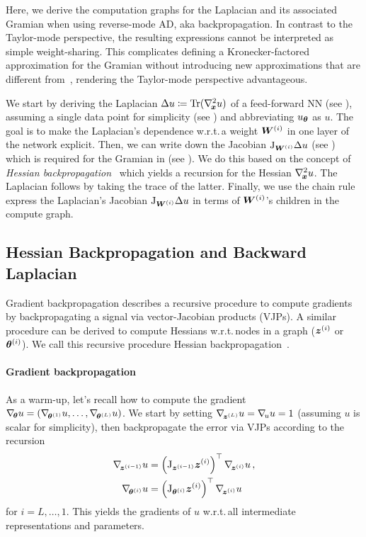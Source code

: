Here, we derive the computation graphs for the Laplacian and its associated Gramian when using reverse-mode AD, aka backpropagation.
In contrast to the Taylor-mode perspective, the resulting expressions cannot be interpreted as simple weight-sharing.
This complicates defining a Kronecker-factored approximation for the Gramian without introducing new approximations that are different from~\citet{eschenhagen2023kroneckerfactored}, rendering the Taylor-mode perspective advantageous.

We start by deriving the Laplacian $\Delta u \coloneqq \operatorname{Tr}(\nabla_{\!{{\bm{x}}}}^{2} u)$ of a feed-forward NN (see ), assuming a single data point for simplicity (see ) and abbreviating $u_{{\bm{\theta}}}$ as $u$.
The goal is to make the Laplacian's dependence w.r.t.\,a weight ${\bm{W}}^{(i)}$ in one layer of the network explicit.
Then, we can write down the Jacobian $\mathrm{J}_{{\bm{W}}^{(i)}}\Delta u$ (see ) which is required for the Gramian in  (see ).
We do this based on the concept of \emph{Hessian backpropagation}~\citep[HBP,]{dangel2020modular} which yields a recursion for the Hessian $\nabla_{\!{{\bm{x}}}}^{2}u$.
The Laplacian follows by taking the trace of the latter.
Finally, we use the chain rule express the Laplacian's Jacobian $\mathrm{J}_{{\bm{W}}^{(i)}} \Delta u$ in terms of ${\bm{W}}^{(i)}$'s children in the compute graph.

\subsection{Hessian Backpropagation and Backward Laplacian}\label{sec:laplacian-computation-graph}

Gradient backpropagation describes a recursive procedure to compute gradients by backpropagating a signal via vector-Jacobian products (VJPs).
A similar procedure can be derived to compute Hessians w.r.t.\,nodes in a graph (${\bm{z}}^{(i)}$ or ${\bm{\theta}}^{(i)}$).
We call this recursive procedure Hessian backpropagation~\citep{dangel2020modular}.

\paragraph{Gradient backpropagation} As a warm-up, let's recall how to compute the gradient $\nabla_{\!{{\bm{\theta}}}}u = (\nabla_{\!{{\bm{\theta}}^{(1)}}}u, \dots, \nabla_{\!{{\bm{\theta}}^{(L)}}}u)$.
We start by setting $\nabla_{\!{{\bm{z}}^{(L)}}}u = \nabla_{\!{u}}u = 1$ (assuming $u$ is scalar for simplicity), then backpropagate the error via VJPs according to the recursion
\begin{align}\label{eq:gradient-backpropagation}
  \begin{split}
    \nabla_{\!{{\bm{z}}^{(i-1)}}}u
    &=
      \left( \mathrm{J}_{{\bm{z}}^{(i-1)}} {\bm{z}}^{(i)} \right)^{\top} \nabla_{\!{{\bm{z}}^{(i)}}}u\,,
    \\
    \nabla_{\!{{\bm{\theta}}^{(i)}}}u
    &=
      \left( \mathrm{J}_{{\bm{\theta}}^{(i)}} {\bm{z}}^{(i)} \right)^{\top} \nabla_{\!{{\bm{z}}^{(i)}}}u\,
  \end{split}
\end{align}
for $i = L, \dots, 1$.
This yields the gradients of $u$ w.r.t.\,all intermediate representations and parameters.

